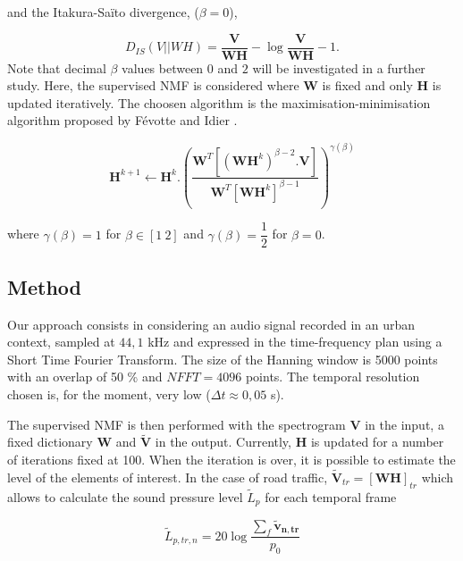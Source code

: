 \documentclass{article}
\begin{document}
\begin{sloppy}
and the Itakura-Saïto divergence, ($\beta = 0$), 
 
\begin{equation}\label{eq:divIS}
D_{IS}(V\vert\vert WH) = \frac{\mathbf{V}}{\mathbf{WH}} -\log\frac{\mathbf{V}}{\mathbf{WH}}-1.
\end{equation}
Note that decimal $\beta$ values between $0$ and $2$ will be investigated in a further study. Here, the supervised NMF is considered where $\mathbf{W}$ is fixed and only $\mathbf{H}$ is updated iteratively. The choosen algorithm is the maximisation-minimisation algorithm proposed by F\'{e}votte and Idier \cite{fevotte2011}.

\begin{equation}
\mathbf{H}^{k+1} \longleftarrow \mathbf{H}^{k}.\left(\frac{\mathbf{W}^T\left[(\mathbf{WH}^{k})^{\beta-2}.\mathbf{V} \right]}{\mathbf{W}^T \left[ \mathbf{WH}^{k} \right]^{\beta-1}}\right)^{\gamma(\beta)}
\end{equation}

where $\gamma(\beta) = 1$ for $\beta \in [1~2]$ and $\gamma(\beta) = \dfrac{1}{2}$ for $\beta = 0$. 

\subsection{Method}

Our approach consists in considering an audio signal recorded in an urban context, sampled at $44,1$ kHz and expressed in the time-frequency plan using a Short Time Fourier Transform. The size of the Hanning window is 5000 points with an overlap of 50 \% and $NFFT = 4096$ points. The temporal resolution chosen is, for the moment, very low ($\Delta t \approx 0,05$ s). 

The supervised NMF is then performed with the spectrogram $\mathbf{V}$ in the input, a fixed dictionary $\mathbf{W}$ and $\mathbf{\tilde{V}}$ in the output. Currently, $\mathbf{H}$ is updated for a number of iterations fixed at 100. When the iteration is over, it is possible to estimate the level of the elements of interest. In the case of road traffic, $\mathbf{\tilde{V}}_{tr} = \left[\mathbf{WH}\right]_{tr}$ which allows to calculate the sound pressure level $\tilde{L}_{p}$ for each temporal frame

\begin{equation}\label{eq:Lp}
\tilde{L}_{p,tr,n} = 20\log\frac{\sum_f\mathbf{\mathbf{\tilde{v}}_{\mathbf{n},tr}}}{p_{0}}
\end{equation} 



\end{sloppy}
\end{document}
